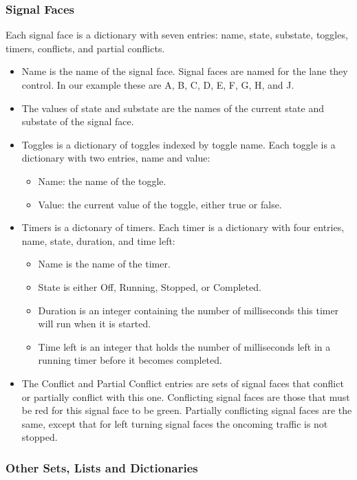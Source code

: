 \documentclass[letterpaper,twoside]{article}
\begin{document}
\subsubsection{Signal Faces}

Each signal face is a dictionary with seven entries: name, state, substate,
toggles, timers, conflicts, and partial conflicts.
\begin{itemize}
\item{Name is the name of the signal face.  Signal faces are named for
  the lane they control.  In our example these are
  A, B, C, D, E, F, G, H, and J.}
\item{The values of state and substate are the names of the current state
  and substate of the signal face.}
\item{Toggles is a dictionary of toggles indexed by toggle name.
  Each toggle is a dictionary with two entries, name and value:}
  \begin{itemize}
  \item{Name: the name of the toggle.}
  \item{Value: the current value of the toggle, either true or false.}
  \end{itemize}
\item{Timers is a dictonary of timers.  Each timer is a dictionary with
  four entries, name, state, duration, and time left:}
  \begin{itemize}
    \item{Name is the name of the timer.}
    \item{State is either Off, Running, Stopped, or Completed.}
    \item{Duration is an integer containing the number of milliseconds
      this timer will run when it is started.}
    \item{Time left is an integer that holds the number of milliseconds
      left in a running timer before it becomes completed.}
  \end{itemize}

\item{The Conflict and Partial Conflict entries are sets of signal faces
    that conflict or partially conflict with this one.  Conflicting
    signal faces are those that must be red for this signal face to be green.
    Partially conflicting signal faces are the same, except that for left
    turning signal faces the oncoming traffic is not stopped.}
\end{itemize}

\subsubsection{Other Sets, Lists and Dictionaries}
\end{document}
